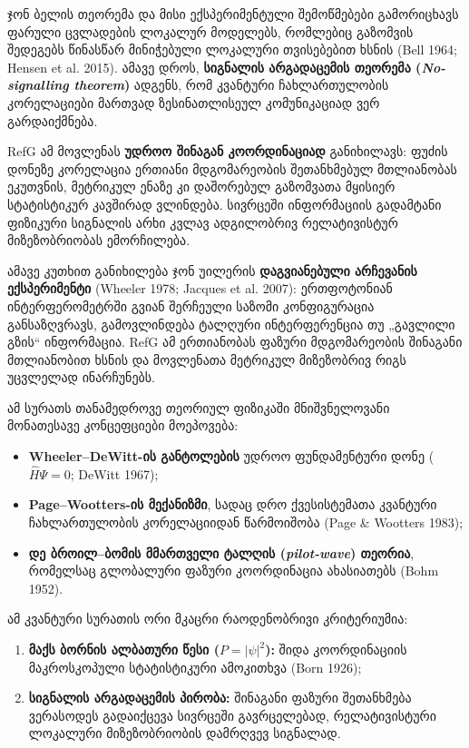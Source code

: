 \documentclass[11pt,a4paper]{article}
\begin{document}
ჯონ ბელის თეორემა და მისი ექსპერიმენტული შემოწმებები გამორიცხავს ფარული ცვლადების ლოკალურ მოდელებს, რომლებიც გაზომვის შედეგებს წინასწარ მინიჭებული ლოკალური თვისებებით ხსნის (Bell 1964; Hensen et al. 2015). ამავე დროს, \textbf{სიგნალის არგადაცემის თეორემა (\emph{No-signalling theorem})} ადგენს, რომ კვანტური ჩახლართულობის კორელაციები მართვად ზესინათლისეულ კომუნიკაციად ვერ გარდაიქმნება.

RefG ამ მოვლენას \textbf{უდროო შინაგან კოორდინაციად} განიხილავს: ფუძის დონეზე კორელაცია ერთიანი მდგომარეობის შეთანხმებულ მთლიანობას ეკუთვნის, მეტრიკულ ენაზე კი დაშორებულ გაზომვათა მყისიერ სტატისტიკურ კავშირად ვლინდება. სივრცეში ინფორმაციის გადამტანი ფიზიკური სიგნალის არხი კვლავ ადგილობრივ რელატივისტურ მიზეზობრიობას ემორჩილება.

ამავე კუთხით განიხილება ჯონ უილერის \textbf{დაგვიანებული არჩევანის ექსპერიმენტი} (Wheeler 1978; Jacques et al. 2007): ერთფოტონიან ინტერფერომეტრში გვიან შერჩეული საზომი კონფიგურაცია განსაზღვრავს, გამოვლინდება ტალღური ინტერფერენცია თუ „გავლილი გზის“ ინფორმაცია. RefG ამ ერთიანობას ფაზური მდგომარეობის შინაგანი მთლიანობით ხსნის და მოვლენათა მეტრიკულ მიზეზობრივ რიგს უცვლელად ინარჩუნებს.

ამ სურათს თანამედროვე თეორიულ ფიზიკაში მნიშვნელოვანი მონათესავე კონცეფციები მოეპოვება:

\begin{itemize}
\item \textbf{Wheeler–DeWitt-ის განტოლების} უდროო ფუნდამენტური დონე ($\hat{H}\Psi = 0$; DeWitt 1967);
\item \textbf{Page–Wootters-ის მექანიზმი}, სადაც დრო ქვესისტემათა კვანტური ჩახლართულობის კორელაციიდან წარმოიშობა (Page \& Wootters 1983);
\item \textbf{დე ბროილ–ბომის მმართველი ტალღის (\emph{pilot-wave}) თეორია}, რომელსაც გლობალური ფაზური კოორდინაცია ახასიათებს (Bohm 1952).

\end{itemize}
ამ კვანტური სურათის ორი მკაცრი რაოდენობრივი კრიტერიუმია:

\begin{enumerate}[label=\arabic*.]
\item \textbf{მაქს ბორნის ალბათური წესი ($P = |\psi|^2$):} შიდა კოორდინაციის მაკროსკოპული სტატისტიკური ამოკითხვა (Born 1926);
\item \textbf{სიგნალის არგადაცემის პირობა:} შინაგანი ფაზური შეთანხმება ვერასოდეს გადაიქცევა სივრცეში გავრცელებად, რელატივისტური ლოკალური მიზეზობრიობის დამრღვევ სიგნალად.


\end{enumerate}
\end{document}
